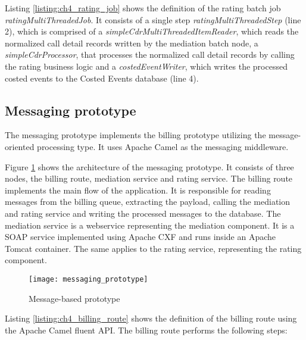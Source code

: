 Listing \ref{listing:ch4_rating_job} shows the definition of the rating batch job \emph{ratingMultiThreadedJob}. It consists of a single step \emph{ratingMultiThreadedStep} (line 2), which is comprised of a \emph{simpleCdrMultiThreadedItemReader}, which reads the normalized call detail records written by the mediation batch node, a \emph{simpleCdrProcessor}, that processes the normalized call detail records by calling the rating business logic and a \emph{costedEventWriter}, which writes the processed costed events to the Costed Events database (line 4).



\subsection{Messaging prototype}
\label{sec:ch04_messaging_prototype}

The messaging prototype implements the billing prototype utilizing the message-oriented processing type. It uses Apache Camel \citep{apachecamel} as the messaging middleware.

Figure \ref{fig:ch4_messaging_prototype} shows the architecture of the messaging prototype. It consists of three nodes, the billing route, mediation service and rating service. The billing route implements the main flow of the application. It is responsible for reading messages from the billing queue, extracting the payload, calling the mediation and rating service and writing the processed messages to the database. The mediation service is a webservice representing the mediation component. It is a SOAP service implemented using Apache CXF and runs inside an Apache Tomcat container. The same applies to the rating service, representing the rating component.

\begin{figure}[htbp]
	\centering
	\texttt{[image: messaging\_prototype]}
	\caption{Message-based prototype}
	\label{fig:ch4_messaging_prototype}
\end{figure}

Listing \ref{listing:ch4_billing_route} shows the definition of the billing route using the Apache Camel fluent \ac{API}.
The billing route performs the following steps:


